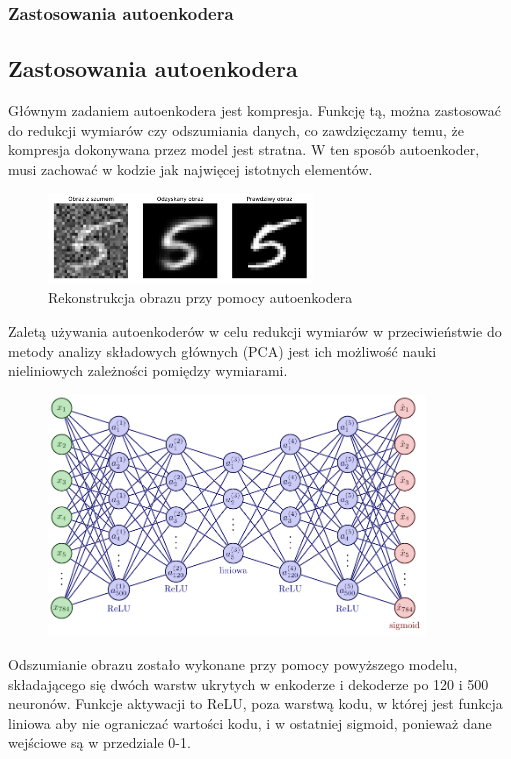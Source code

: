 \documentclass{beamer}
\begin{document}
	\begin{frame}
		\frametitle{Zastosowania autoenkodera}
		\subsection{Zastosowania autoenkodera}
		Głównym zadaniem autoenkodera jest kompresja. Funkcję tą, można zastosować do redukcji wymiarów czy odszumiania danych, co zawdzięczamy temu, że kompresja dokonywana przez model jest stratna. W ten sposób autoenkoder, musi zachować w kodzie jak najwięcej istotnych elementów. 
		\vspace{-0.3cm}
		\begin{figure}
			\centering\includegraphics[width=7cm]{denoisingae.pdf}
			\caption{Rekonstrukcja obrazu przy pomocy autoenkodera}
			\label{fig:rekonstrukcja}
		\end{figure}
		\vspace{-0.5cm}
		Zaletą używania autoenkoderów w celu redukcji wymiarów w przeciwieństwie do metody analizy składowych głównych (PCA) jest ich możliwość nauki nieliniowych zależności pomiędzy wymiarami.
	\end{frame}

	\begin{frame}
		\vspace{-1cm}
		\begin{figure}
			\centering\includegraphics[width=10cm]{prawdziwyae.pdf}
		\end{figure}
		\vspace{-0.5cm}
	Odszumianie obrazu zostało wykonane przy pomocy powyższego modelu, składającego się dwóch warstw ukrytych w enkoderze i dekoderze po 120 i 500 neuronów. Funkcje aktywacji to ReLU, poza warstwą kodu, w której jest funkcja liniowa aby nie ograniczać wartości kodu, i w ostatniej sigmoid, ponieważ dane wejściowe są w przedziale 0-1.
	\vspace{-0.5cm}
	\end{frame}
\end{document}
